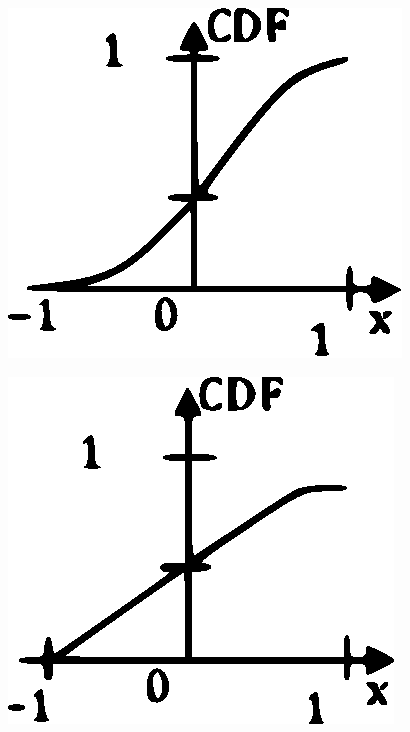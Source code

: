 \begin{enumerate}[label=\thesection.\arabic*.,ref=\thesection.\theenumi]
\begin{enumerate}
\begin{multicols}{2}
\end{multicols}
\end{enumerate}
\begin{figure}[!h]
\includegraphics[width=\columnwidth]{./figs/figure3.eps}
\caption{}
\label{fig:3}
\end{figure}
\begin{figure}[!h]
\includegraphics[width=\columnwidth]{./figs/figure4.eps}

\end{figure}
\end{enumerate}

